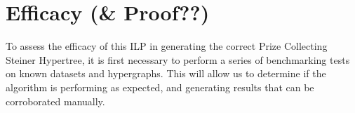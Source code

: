 \documentclass[12pt,twoside]{reedthesis}
\theoremstyle{definition}
\begin{document}
  \chapter{Efficacy (\& Proof??)}

  To assess the efficacy of this ILP in generating the correct Prize Collecting Steiner Hypertree, it is first necessary to perform a series of benchmarking tests on known datasets and hypergraphs.  This will allow us to determine if the algorithm is performing as expected, and generating results that can be corroborated manually.\par
%
%
%
%
\end{document}
